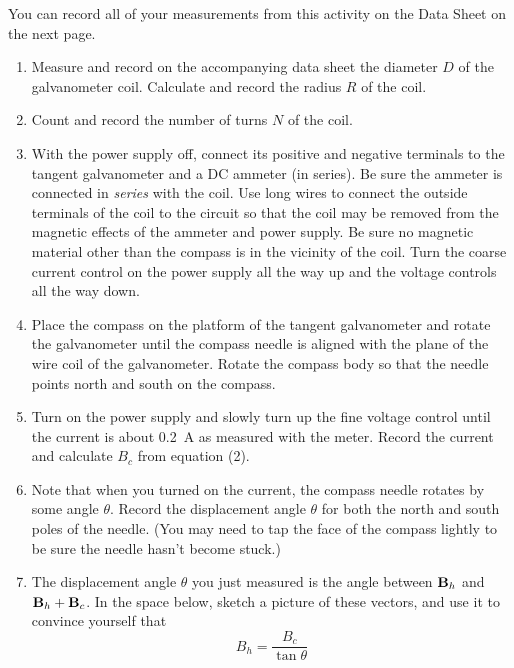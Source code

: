 You can record all of your measurements from this activity on the Data Sheet on the next page.
\begin{enumerate}[labparts]
\item Measure and record on the accompanying data sheet the diameter $D$ of
the galvanometer coil. Calculate and record the radius $R$ of the coil.  

\item Count and record the number of turns $N$ of the coil.

\item With the power supply off, connect its positive and negative terminals 
to the tangent galvanometer and  a DC ammeter (in series). 
Be sure the ammeter is connected in \textit{series} with 
the coil. Use long wires to connect the outside terminals of the coil
to the circuit so that the coil may be removed from the magnetic effects
of the ammeter and power supply. Be sure no magnetic material other
than the compass is in the vicinity of the coil. Turn the coarse current 
control on the power supply all the way up and the voltage controls all the 
way down.

\item Place the compass on the platform of the tangent galvanometer and rotate  
the galvanometer until the compass needle is aligned with the plane of the wire 
coil of the galvanometer. Rotate the compass body so that the needle points 
north and south on the compass.

\item Turn on the power supply and slowly turn up the fine voltage control 
until the current is about 0.2~A as measured with the meter. Record the current and calculate $B_c$ from equation (2).

\item Note that when you turned on the current, the compass needle rotates by some angle $\theta$. 
Record the displacement angle $\theta$ for both the north and south poles of the needle.
(You may need to tap the face of the compass lightly to be sure the needle hasn't become stuck.)

\item The displacement angle $\theta$ you just measured is the angle between ${\bf B}_h$ and
${\bf B}_h+{\bf B}_c$.  In the space below, sketch a picture of these vectors, and
use it to convince yourself that
\begin{equation}
B_h = \frac{B_c}{\tan\theta} 
\end{equation}
\answerspace{1in}


\end{enumerate}
